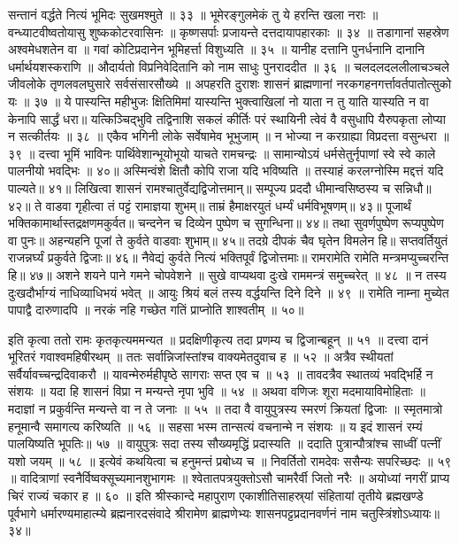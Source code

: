 सन्तानं वर्द्धते नित्यं भूमिदः सुखमश्मुते ॥ ३३ ॥
भूमेरङ्गुलमेकं तु ये हरन्ति खला नराः ॥
वन्ध्याटवीष्वतोयासु शुष्ककोटरवासिनः ॥
कृष्णसर्पाः प्रजायन्ते दत्तदायापहारकाः ॥ ३४ ॥
तडागानां सहस्रेण अश्वमेधशतेन वा ॥
गवां कोटिप्रदानेन भूमिहर्त्ता विशुध्यति ॥ ३५ ॥
यानीह दत्तानि पुनर्धनानि दानानि धर्मार्थयशस्कराणि ॥
औदार्यतो विप्रनिवेदितानि को नाम साधुः पुनराददीत ॥ ३६ ॥
चलदलदललीलाचञ्चले जीवलोके तृणलवलघुसारे सर्वसंसारसौख्ये ॥
अपहरति दुराशः शासनं ब्राह्मणानां नरकगहनगर्त्तावर्तपातोत्सुको यः ॥ ३७ ॥
ये पास्यन्ति महीभुजः क्षितिमिमां यास्यन्ति भुक्त्वाखिलां नो याता न तु याति यास्यति न वा केनापि सार्द्धं धरा॥
यत्किञ्चिद्भुवि तद्विनाशि सकलं कीर्तिः परं स्थायिनी त्वेवं वै वसुधापि यैरुपकृता लोप्या न सत्कीर्तयः ॥ ३८ ॥
एकैव भगिनी लोके सर्वेषामेव भूभुजाम् ॥
न भोज्या न करग्राह्या विप्रदत्ता वसुन्धरा ॥ ३९ ॥
दत्त्वा भूमिं भाविनः पार्थिवेशान्भूयोभूयो याचते रामचन्द्रः ॥
सामान्योऽयं धर्मसेतुर्नृपाणां स्वे स्वे काले पालनीयो भवद्भिः ॥ ४०॥
अस्मिन्वंशे क्षितौ कोपि राजा यदि भविष्यति ॥
तस्याहं करलग्नोस्मि मद्दत्तं यदि पाल्यते॥ ४१॥
लिखित्वा शासनं रामश्चातुर्वेद्यद्विजोत्तमान्॥
सम्पूज्य प्रददौ धीमान्वसिष्ठस्य च सन्निधौ॥ ४२॥
ते वाडवा गृहीत्वा तं पट्टं रामाज्ञया शुभम्॥
ताम्रं हैमाक्षरयुतं धर्म्यं धर्मविभूषणम्॥ ४३॥
पूजार्थं भक्तिकामार्थास्तद्रक्षणमकुर्वत॥
चन्दनेन च दिव्येन पुष्पेण च सुगन्धिना॥ ४४॥
तथा सुवर्णपुष्पेण रूप्यपुष्पेण वा पुनः॥
अहन्यहनि पूजां ते कुर्वते वाडवाः शुभाम्॥ ४५॥
तदग्रे दीपकं चैव घृतेन विमलेन हि॥
सप्तवर्तियुतं राजन्नर्घ्यं प्रकुर्वते द्विजाः॥ ४६॥
नैवेद्यं कुर्वते नित्यं भक्तिपूर्वं द्विजोत्तमाः॥
रामरामेति रामेति मन्त्रमप्युच्चरन्ति हि॥ ४७॥
अशने शयने पाने गमने चोपवेशने ॥
सुखे वाप्यथवा दुःखे राममन्त्रं समुच्चरेत् ॥ ४८ ॥
न तस्य दुःखदौर्भाग्यं नाधिव्याधिभयं भवेत् ॥
आयुः श्रियं बलं तस्य वर्द्धयन्ति दिने दिने ॥ ४९ ॥
रामेति नाम्ना मुच्येत पापाद्वै दारुणादपि ॥
नरकं नहि गच्छेत गतिं प्राप्नोति शाश्वतीम् ॥ ५०॥

इति कृत्वा ततो रामः कृतकृत्यममन्यत ॥
प्रदक्षिणीकृत्य तदा प्रणम्य च द्विजान्बहून् ॥ ५१ ॥
दत्त्वा दानं भूरितरं गवाश्वमहिषीरथम् ॥
ततः सर्वान्निजांस्तांश्च वाक्यमेतदुवाच ह ॥ ५२ ॥
अत्रैव स्थीयतां सर्वैर्यावच्चन्द्रदिवाकरौ ॥
यावन्मेरुर्महीपृष्ठे सागराः सप्त एव च ॥ ५३ ॥
तावदत्रैव स्थातव्यं भवद्भिर्हि न संशयः ॥
यदा हि शासनं विप्रा न मन्यन्ते नृपा भुवि ॥ ५४ ॥
अथवा वणिजः शूरा मदमायाविमोहिताः ॥
मदाज्ञां न प्रकुर्वन्ति मन्यन्ते वा न ते जनाः ॥ ५५ ॥
तदा वै वायुपुत्रस्य स्मरणं क्रियतां द्विजाः ॥
स्मृतमात्रो हनूमान्वै समागत्य करिष्यति ॥ ५६ ॥
सहसा भस्म तान्सत्यं वचनान्मे न संशयः ॥
य इदं शासनं रम्यं पालयिष्यति भूपतिः॥ ५७ ॥
वायुपुत्रः सदा तस्य सौख्यमृद्धिं प्रदास्यति ॥
ददाति पुत्रान्पौत्रांश्च साध्वीं पत्नीं यशो जयम् ॥ ५८ ॥
इत्येवं कथयित्वा च हनुमन्तं प्रबोध्य च ॥
निवर्तितो रामदेवः ससैन्यः सपरिच्छदः ॥ ५९ ॥
वादित्राणां स्वनैर्विष्वक्सूच्यमानशुभागमः ॥
श्वेतातपत्रयुक्तोऽसौ चामरैर्वी जितो नरैः ॥
अयोध्यां नगरीं प्राप्य चिरं राज्यं चकार ह ॥ ६० ॥
इति श्रीस्कान्दे महापुराण एकाशीतिसाहस्र्यां संहितायां तृतीये ब्रह्मखण्डे पूर्वभागे धर्मारण्यमाहात्म्ये ब्रह्मनारदसंवादे श्रीरामेण ब्राह्मणेभ्यः शासनपट्टप्रदानवर्णनं नाम चतुस्त्रिंशोऽध्यायः॥३४॥

